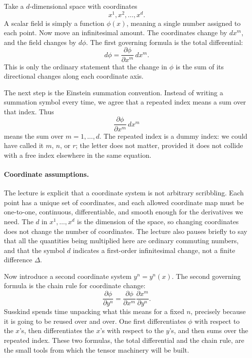 Take a \(d\)-dimensional space with coordinates
\[
x^{1},x^{2},\dots,x^{d}.
\]
A scalar field is simply a function \(\phi(x)\), meaning a single number assigned to each point. Now move an infinitesimal amount. The coordinates change by \(dx^{m}\), and the field changes by \(d\phi\). The first governing formula is the total differential:
\begin{equation}
d\phi=\frac{\partial \phi}{\partial x^{m}}\,dx^{m}.
\end{equation}
This is only the ordinary statement that the change in \(\phi\) is the sum of its directional changes along each coordinate axis.

The next step is the Einstein summation convention. Instead of writing a summation symbol every time, we agree that a repeated index means a sum over that index. Thus
\[
\frac{\partial \phi}{\partial x^{m}}\,dx^{m}
\]
means the sum over \(m=1,\dots,d\). The repeated index is a dummy index: we could have called it \(m\), \(n\), or \(r\); the letter does not matter, provided it does not collide with a free index elsewhere in the same equation.

\paragraph{Coordinate assumptions.} The lecture is explicit that a coordinate system is not arbitrary scribbling. Each point has a unique set of coordinates, and each allowed coordinate map must be one-to-one, continuous, differentiable, and smooth enough for the derivatives we need. The \(d\) in \(x^{1},\dots,x^{d}\) is the dimension of the space, so changing coordinates does not change the number of coordinates. The lecture also pauses briefly to say that all the quantities being multiplied here are ordinary commuting numbers, and that the symbol \(d\) indicates a first-order infinitesimal change, not a finite difference \(\Delta\).

Now introduce a second coordinate system \(y^{n}=y^{n}(x)\). The second governing formula is the chain rule for coordinate change:
\begin{equation}
\frac{\partial \phi}{\partial y^{n}}
=
\frac{\partial \phi}{\partial x^{m}}
\frac{\partial x^{m}}{\partial y^{n}}.
\end{equation}
Susskind spends time unpacking what this means for a fixed \(n\), precisely because it is going to be reused over and over. One first differentiates \(\phi\) with respect to the \(x\)'s, then differentiates the \(x\)'s with respect to the \(y\)'s, and then sums over the repeated index. These two formulas, the total differential and the chain rule, are the small tools from which the tensor machinery will be built.

